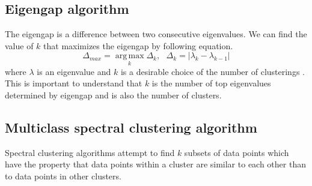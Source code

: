 \subsection{Eigengap algorithm}
\label{subsec:eigengap}
The eigengap is a difference between two consecutive eigenvalues. 
We can find the value of $k$ that maximizes the eigengap by following equation. 
\begin{equation}
\Delta_{max} = \operatorname*{arg\,max}_{k} \Delta_k, \text{~~} \Delta_k = | \lambda_k - \lambda_{k-1} |
\end{equation}
where $\lambda$ is an eigenvalue and $k$ is a desirable choice of the number of clusterings \cite{ulrike07}.
This is important to understand that $k$ is the number of top eigenvalues determined by eigengap and is also the number of clusters. 

\subsection{Multiclass spectral clustering algorithm}
\label{subsec:multiclass}
Spectral clustering algorithms attempt to find $k$ subsets of data points which have the property that data points within a cluster are similar to each other than to data points in other clusters. 

